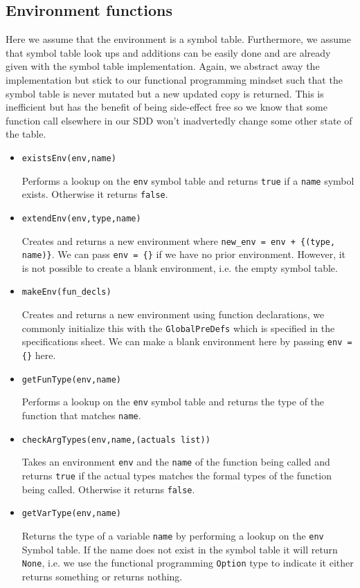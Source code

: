 \documentclass{article}
\begin{document}
\subsection{Environment functions}
Here we assume that the environment is a symbol table. Furthermore, we assume that symbol table look ups and additions can be easily done and are already given with the symbol table implementation. Again, we abstract away the implementation but stick to our functional programming mindset such that the symbol table is never mutated but a new updated copy is returned. This is inefficient but has the benefit of being side-effect free so we know that some function call elsewhere in our SDD won't inadvertedly change some other state of the table.
\begin{itemize}
\item \verb|existsEnv(env,name)|
\begin{sloppypar}
Performs a lookup on the \verb|env| symbol table and returns \verb|true| if a  \verb|name| symbol exists. Otherwise it returns \verb|false|.
\end{sloppypar}
\item \verb|extendEnv(env,type,name)|
\begin{sloppypar}
Creates and returns a new environment where \verb|new_env = env + {(type, name)}|. We can pass \verb|env = {}| if we have no prior environment. However, it is not possible to create a blank environment, i.e. the empty symbol table.
\end{sloppypar}
\item \verb|makeEnv(fun_decls)|
\begin{sloppypar}
Creates and returns a new environment using function declarations, we commonly initialize this with the \verb|GlobalPreDefs| which is specified in the specifications sheet. We can make a blank environment here by passing \verb|env = {}| here.
\end{sloppypar}
\item \verb|getFunType(env,name)|
\begin{sloppypar}
Performs a lookup on the \verb|env| symbol table and returns the type of the function that matches \verb|name|.
\end{sloppypar}
\item \verb|checkArgTypes(env,name,(actuals list))|
\begin{sloppypar}
Takes an environment \verb|env| and the \verb|name| of the function being called and returns \verb|true| if the actual types matches the formal types of the function being called. Otherwise it returns \verb|false|.
\end{sloppypar}
\item \verb|getVarType(env,name)|
\begin{sloppypar}
Returns the type of a variable \verb|name| by performing a lookup on the \verb|env| Symbol table. If the name does not exist in the symbol table it will return \texttt{None}, i.e. we use the functional programming \texttt{Option} type to indicate it either returns something or returns nothing.
\end{sloppypar}
\end{itemize}
\end{document}
